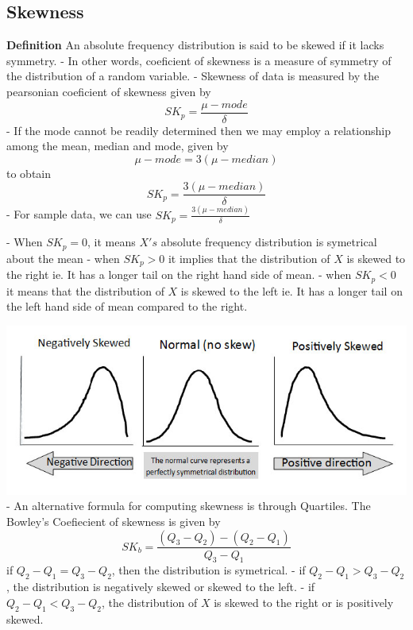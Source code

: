 \documentclass[12pt]{article}
\begin{document}
\subsection{Skewness}
\textbf{Definition} An absolute frequency distribution is said to be skewed if it lacks symmetry.
- In other words, coeficient of skewness is a measure of symmetry of the distribution of a random variable.
- Skewness of data is measured by the pearsonian coeficient of skewness given by
\begin{equation}
    SK_p = \frac{\mu - mode}{\delta}
\end{equation}
- If the mode cannot be readily determined then we may employ a relationship among the mean, median and mode, given by
\begin{equation}
    \mu - mode = 3(\mu - median)
\end{equation}
to obtain
\begin{equation}
    SK_p = \frac{3(\mu - median)}{\delta}
\end{equation}
- For sample data, we can use $SK_p = \frac{3(\mu - median)}{\delta}$

- When $SK_p = 0$, it means $X's$ absolute frequency distribution is symetrical about the mean
- when $SK_p > 0$ it implies that the distribution of $X$ is skewed to the right ie. It has a longer tail on the right hand side of mean.
- when $SK_p < 0$ it means that the distribution of $X$ is skewed to the left ie. It has a longer tail on the left hand side of mean compared to the right.

\hbox{\includegraphics[width=\textwidth]{measure-of-skewness.jpg}}
- An alternative formula for computing skewness is through Quartiles. The Bowley's Coefiecient of skewness is given by
\begin{equation}
    SK_b = \frac{(Q_3 - Q_2)-(Q_2 - Q_1)}{Q_3 - Q_1}
\end{equation}
if $Q_2 - Q_1 = Q_3 - Q_2$, then the distribution is symetrical.
- if $Q_2 - Q_1 > Q_3 - Q_2$, the distribution is negatively skewed or skewed to the left.
- if $Q_2 - Q_1 < Q_3 - Q_2$, the distribution of $X$ is skewed to the right or is positively skewed.
\end{document}
